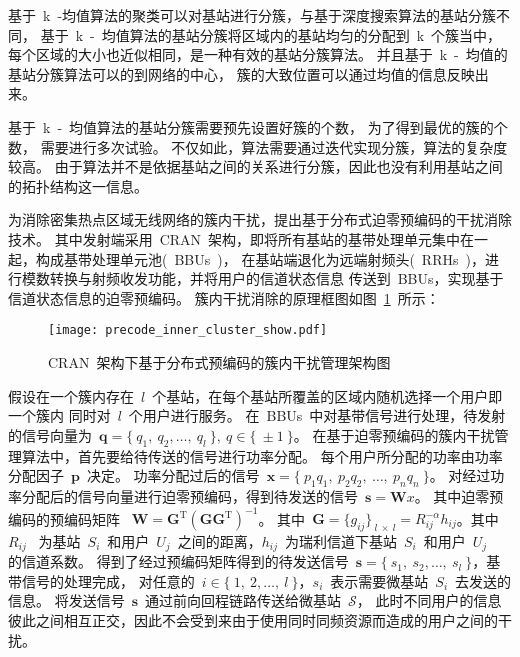 基于~k~-均值算法的聚类可以对基站进行分簇，与基于深度搜索算法的基站分簇不同，
基于~k~-~均值算法的基站分簇将区域内的基站均匀的分配到~k~个簇当中，
每个区域的大小也近似相同，是一种有效的基站分簇算法。
并且基于~k~-~均值的基站分簇算法可以的到网络的中心，
簇的大致位置可以通过均值的信息反映出来。

基于~k~-~均值算法的基站分簇需要预先设置好簇的个数，
为了得到最优的簇的个数，
需要进行多次试验。
不仅如此，算法需要通过迭代实现分簇，算法的复杂度较高。
由于算法并不是依据基站之间的关系进行分簇，因此也没有利用基站之间的拓扑结构这一信息。


为消除密集热点区域无线网络的簇内干扰，提出基于分布式迫零预编码的干扰消除技术。
其中发射端采用~CRAN~架构，即将所有基站的基带处理单元集中在一起，构成基带处理单元池(~BBUs~)，
在基站端退化为远端射频头(~RRHs~)，进行模数转换与射频收发功能，并将用户的信道状态信息
传送到~BBUs，实现基于信道状态信息的迫零预编码。
簇内干扰消除的原理框图如图~\ref{precode_inner_cluster_show}~所示：
\begin{figure}[htbp]
\centering
\texttt{[image: precode\_inner\_cluster\_show.pdf]}
\caption{CRAN~架构下基于分布式预编码的簇内干扰管理架构图}\vspace{-0.5em}
\label{precode_inner_cluster_show}
\end{figure}
假设在一个簇内存在~$l$~个基站，在每个基站所覆盖的区域内随机选择一个用户即一个簇内
同时对~$l$~个用户进行服务。
在~BBUs~中对基带信号进行处理，待发射的信号向量为~$\mathbf{q}=\{~q_1,~q_2,\dots,~q_l~\}, ~q\in\{~\pm 1~\}$。
在基于迫零预编码的簇内干扰管理算法中，首先要给待传送的信号进行功率分配。
每个用户所分配的功率由功率分配因子~$\mathbf{p}$~决定。
功率分配过后的信号~$\mathbf{x}=\{~p_1q_1,~p_2q_2,~\dots,~p_nq_n~\}$。
对经过功率分配后的信号向量进行迫零预编码，得到待发送的信号~$\mathbf{s}=\mathbf{W}x$。
其中迫零预编码的预编码矩阵
~$\mathbf{W}=\mathbf{G}^{\mathrm{T}}(\mathbf{G}\mathbf{G}^{\mathrm{T}})^{-1}$。
其中~$\mathbf{G}=\{g_{ij}\}_{~l~\times~ l}=R_{ij}^{-\alpha}h_{ij}$。其中~$R_{ij}$~
为基站~$S_i$~和用户~$U_j$~之间的距离，$h_{ij}$~为瑞利信道下基站~$S_i$~和用户~$U_j$~
的信道系数。
得到了经过预编码矩阵得到的待发送信号~$\mathbf{s}=\{~s_1,~s_2,\dots,~s_l~\}$，基带信号的处理完成，
对任意的~$i\in\{~1,~2,\dots,~l~\}$，$s_i$~表示需要微基站~$S_i$~去发送的信息。
将发送信号~$\mathbf{s}$~通过前向回程链路传送给微基站~$\mathcal{S}$，
此时不同用户的信息彼此之间相互正交，因此不会受到来由于使用同时同频资源而造成的用户之间的干扰。

